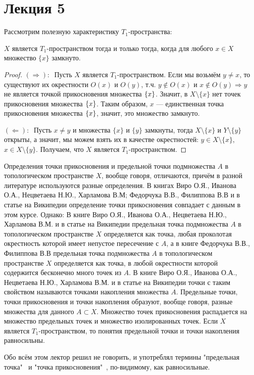 \section{Лекция 5}


Рассмотрим полезную характеристику $T_1$-пространства: 

\begin{statement}
    $X$ является $T_1$-пространством тогда и только тогда, когда для любого $x \in X$ множество $\{x\}$ замкнуто.      
\end{statement}
\begin{proof}
    $(\Rightarrow):\ $ Пусть $X$ является $T_1$-пространством. Если мы возьмём $y \neq x$, то существуют их окрестности $O(x)$ и $O(y)$, т.ч. $y \not\in O(x)$ и $x \not\in O(y) \Longrightarrow y$ не является точкой прикосновения множества $\left\{x\right\}$. Значит, в $X \setminus \{x\}$ нет точек прикосновения множества $\left\{x\right\}$. Таким образом, $x$ --- единственная точка прикосновения множества $\left\{x\right\}$, значит, это множество замкнуто.

    $(\Leftarrow):\ $ Пусть $x \neq y$ и множества $\{x\}$ и $\{y\}$ замкнуты, тогда $X \setminus \{x\}$ и $Y \setminus \{y\}$ открыты, а значит, мы можем взять их в качестве окрестностей: $y \in X \setminus \{x\}$,  $x \in X \setminus \{y\}$. Получаем, что $X$ является $T_1$-пространством. 
\end{proof}

\begin{nota_bene}
    Определения точки прикосновения и предельной точки подмножества $A$ в топологическом пространстве $X$, вообще говоря, отличаются, причём в разной литературе используются разные определения.
    В книгах Виро О.Я., Иванова О.А., Нецветаева Н.Ю., Харламова В.М; Федорчука В.В., Филиппова В.В и в статье на Википедии определение точки прикосновения совпадает с данным в этом курсе. Однако:
    В книге Виро О.Я., Иванова О.А., Нецветаева Н.Ю., Харламова В.М. и в статье на Википедии предельная точка подмножества $A$ в топологическом пространстве $X$ определяется как точка, любая проколотая окрестность которой имеет непустое пересечение с $A$,
    а в книге Федорчука В.В., Филиппова В.В предельная точка подмножества $A$ в топологическом пространстве $X$ определяется как точка, в любой окрестности которой содержится бесконечно много точек из $A$. В книге Виро О.Я., Иванова О.А., Нецветаева Н.Ю., Харламова В.М. и в статье на Википедии точки с таким свойством называются точками накопления множества $A$.
    Предельные точки, точки прикосновения и точки накопления образуют, вообще говоря, разные множества для данного $A \subset X$. Множество точек прикосновения распадается на множество предельных точек и множество изолированных точек. Если $X$ является $T_1$-пространством, то понятия предельной точки и точки накопления равносильны.

    Обо всём этом лектор решил не говорить, и употреблял термины "предельная точка" \, и "точка прикосновения" \,, по-видимому, как равносильные.
\end{nota_bene}

